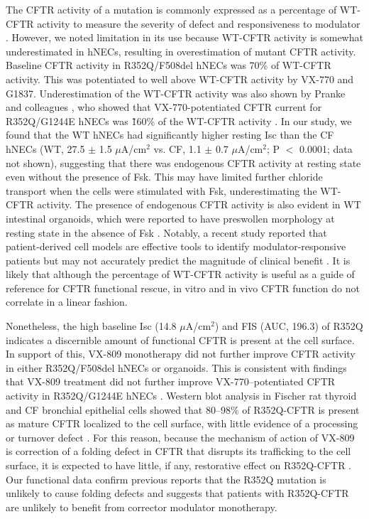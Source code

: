 The CFTR activity of a mutation is commonly expressed as a percentage of WT-CFTR activity to measure the severity of defect and responsiveness to modulator \cite{pranke2017,vangoor2014}. However, we noted limitation in its use because WT-CFTR activity is somewhat underestimated in hNECs, resulting in overestimation of mutant CFTR activity. Baseline CFTR activity in R352Q/F508del hNECs was 70\% of WT-CFTR activity. This was potentiated to well above WT-CFTR activity by VX-770 and G1837. Underestimation of the WT-CFTR activity was also shown by Pranke and colleagues \cite{pranke2017}, who showed that VX-770-potentiated CFTR current for R352Q/G1244E hNECs was \~160\% of the WT-CFTR activity \cite{pranke2017}. In our study, we found that the WT hNECs had significantly higher resting Isc than the CF hNECs (WT, 27.5 $\pm$ 1.5 $\mu$A/cm$^2$ vs. CF, 1.1 $\pm$ 0.7 $\mu$A/cm$^2$; P $<$ 0.0001; data not shown), suggesting that there was endogenous CFTR activity at resting state even without the presence of Fsk. This may have limited further chloride transport when the cells were stimulated with Fsk, underestimating the WT-CFTR activity. The presence of endogenous CFTR activity is also evident in WT intestinal organoids, which were reported to have preswollen morphology at resting state in the absence of Fsk \cite{dekkers2016}. Notably, a recent study reported that patient-derived cell models are effective tools to identify modulator-responsive patients but may not accurately predict the magnitude of clinical benefit \cite{kerem2021}. It is likely that although the percentage of WT-CFTR activity is useful as a guide of reference for CFTR functional rescue, in vitro and in vivo CFTR function do not correlate in a linear fashion.

Nonetheless, the high baseline Isc (14.8 $\mu$A/cm$^2$) and FIS (AUC, 196.3) of R352Q indicates a discernible amount of functional CFTR is present at the cell surface. In support of this, VX-809 monotherapy did not further improve CFTR activity in either R352Q/F508del hNECs or organoids. This is consistent with findings that VX-809 treatment did not further improve VX-770–potentiated CFTR activity in R352Q/G1244E hNECs \cite{pranke2017}. Western blot analysis in Fischer rat thyroid and CF bronchial epithelial cells showed that 80–98\% of R352Q-CFTR is present as mature CFTR localized to the cell surface, with little evidence of a processing or turnover defect \cite{vangoor2014, veit2020}. For this reason, because the mechanism of action of VX-809 is correction of a folding defect in CFTR that disrupts its trafficking to the cell surface, it is expected to have little, if any, restorative effect on R352Q-CFTR \cite{vangoor2011}. Our functional data confirm previous reports that the R352Q mutation is unlikely to cause folding defects and suggests that patients with R352Q-CFTR are unlikely to benefit from corrector modulator monotherapy.

